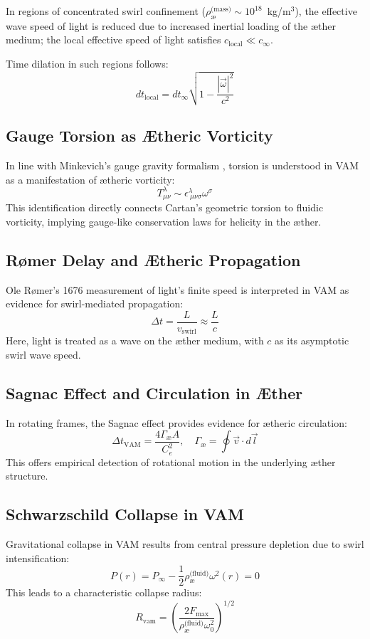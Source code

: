 \documentclass[preprint]{revtex4-2}
\begin{document}
            In regions of concentrated swirl confinement ($\rho_{\text{\ae}}^{\text{(mass)}} \sim 10^{18}$~kg/m$^3$), the effective wave speed of light is reduced due to increased inertial loading of the æther medium; the local effective speed of light satisfies $c_\text{local} \ll c_\infty$.

            Time dilation in such regions follows:
            \[
                dt_\text{local} = dt_\infty \sqrt{1 - \frac{|\vec{\omega}|^2}{c^2}}
            \]

            \subsection*{Gauge Torsion as Ætheric Vorticity}
            In line with Minkevich’s gauge gravity formalism \cite{minkevich2008gauge}, torsion is understood in VAM as a manifestation of ætheric vorticity:
            \[
                T^\lambda_{\mu\nu} \sim \epsilon^{\lambda}_{\ \mu\nu\sigma} \omega^\sigma
            \]
            This identification directly connects Cartan's geometric torsion to fluidic vorticity, implying gauge-like conservation laws for helicity in the æther.

            \subsection*{Rømer Delay and Ætheric Propagation}
            Ole Rømer’s 1676 measurement of light’s finite speed \cite{roemer1676light} is interpreted in VAM as evidence for swirl-mediated propagation:
            \[
                \Delta t = \frac{L}{v_\text{swirl}} \approx \frac{L}{c}
            \]
            Here, light is treated as a wave on the æther medium, with $c$ as its asymptotic swirl wave speed.

            \subsection*{Sagnac Effect and Circulation in Æther}
            In rotating frames, the Sagnac effect provides evidence for ætheric circulation:
            \[
                \Delta t_\text{VAM} = \frac{4 \Gamma_{\text{\ae}} A}{C_e^2}, \quad \Gamma_{\text{\ae}} = \oint \vec{v} \cdot d\vec{l}
            \]
            This offers empirical detection of rotational motion in the underlying æther structure.

            \subsection*{Schwarzschild Collapse in VAM}
            Gravitational collapse in VAM results from central pressure depletion due to swirl intensification:
            \[
                P(r) = P_\infty - \frac{1}{2} \rho_{\text{\ae}}^{\text{(fluid)}} \omega^2(r) = 0
            \]
            This leads to a characteristic collapse radius:
            \[
                R_\text{vam} = \left( \frac{2 F_{\text{max}}}{\rho_{\text{\ae}}^{\text{(fluid)}} \omega_0^2} \right)^{1/2}
            \]
\end{document}
